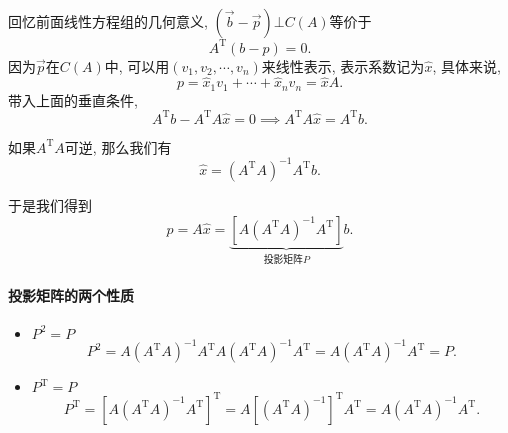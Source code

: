 回忆前面线性方程组的几何意义, $(\vec{b}-\vec{p})\bot C(A)$等价于
\begin{equation}
  A^{\mathrm{T}} \left( b-p \right) = 0. 
\end{equation}
因为$\vec{p}$在$C(A)$中, 可以用$(v_1,v_2,\cdots,v_n)$来线性表示, 表示系数记为$\hat{x}$, 具体来说,
\begin{equation}
  p = \hat{x}_1 v_1 + \cdots + \hat{x}_n v_n = \hat{x} A.
\end{equation}
带入上面的垂直条件, 
\begin{equation}
  A^{\mathrm{T}}b - A^{\mathrm{T}}A \hat{x} = 0 \implies A^{\mathrm{T}} A \hat{x} = A^{\mathrm{T}} b .
\end{equation}

如果$A^{\mathrm{T}}A$可逆, 那么我们有
\begin{equation}
  \hat{x} = \left( A^{\mathrm{T}}A  \right) ^{-1} A^{\mathrm{T}} b .
\end{equation}

于是我们得到
\begin{equation}
  p = A \hat{x} = \underbrace{\left[ A \left( A^{\mathrm{T}}A \right) ^{-1} A^{\mathrm{T}} \right] }_{\text{投影矩阵} P} b .
\end{equation}

\paragraph{投影矩阵的两个性质}
\begin{itemize}
    \item $P^{2}=P$
    \begin{equation}
      P^{2} = A \left( A^{\mathrm{T}}A \right) ^{-1} A^{\mathrm{T}} A \left( A^{\mathrm{T}}A \right)^{-1} A^{\mathrm{T}} = A\left( A^{\mathrm{T}}A \right) ^{-1} A^{\mathrm{T}} = P.
    \end{equation}

    \item $P^{\mathrm{T}}=P$
    \begin{equation}
      P^{\mathrm{T}} = \left[ A \left( A^{\mathrm{T}}A \right) ^{-1}A^{\mathrm{T}} \right] ^{\mathrm{T}} = A \left[ \left( A^{\mathrm{T}}A \right) ^{-1} \right] ^{\mathrm{T}} A^{\mathrm{T}} = A \left( A^{\mathrm{T}}A \right) ^{-1} A^{\mathrm{T}}.
    \end{equation}
\end{itemize}